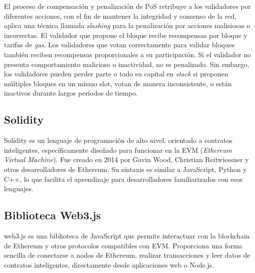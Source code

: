 El proceso de compensación y penalización de PoS retribuye a los validadores por diferentes acciones, con el fin de mantener la integridad y consenso de la red, aplica una técnica llamada \textit{slashing} para la penalización por acciones malisiosas o incorrectas. El validador que propone el bloque recibe recompensas por bloque y tarifas de \textit{gas}. Los validadores que votan correctamente para validar bloques también reciben recompensas proporcionales a su participación. Si el validador no presenta comportamiento malicioso o inactividad, no es penalizado. Sin embargo, los validadores pueden perder parte o todo su capital en \textit{stack} si proponen múltiples bloques en un mismo slot, votan de manera inconsistente, o están inactivos durante largos períodos de tiempo.






\subsection{Solidity}

Solidity \cite{solidity} es un lenguaje de programación de alto nivel, orientado a contratos inteligentes, específicamente diseñado para funcionar en la EVM (\textit{Ethereum Virtual Machine}). Fue creado en 2014 por Gavin Wood, Christian Reitwiessner y otros desarrolladores de Ethereum. Su sintaxis es similar a JavaScript, Python y C++, lo que facilita el aprendizaje para desarrolladores familiarizados con esos lenguajes. 


\subsection{Biblioteca Web3.js}

web3.js \citep{web3} es una biblioteca de JavaScript que permite interactuar con la blockchain de Ethereum y otros protocolos compatibles con EVM. Proporciona una forma sencilla de conectarse a nodos de Ethereum, realizar transacciones y leer datos de contratos inteligentes, directamente desde aplicaciones web o Node.js.


